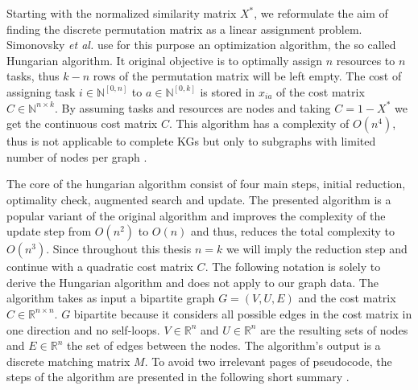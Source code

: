 {%
Starting with the normalized similarity matrix $X^*$, we reformulate the aim of finding the discrete permutation matrix as a linear assignment problem. Simonovsky \textit{et al.} \cite{silver_mastering_2017}use for this purpose an optimization algorithm, the so called Hungarian algorithm. It original objective is to optimally assign $n$ resources to $n$ tasks, thus $k-n$ rows of the permutation matrix will be left empty. The cost of assigning task $i \in \mathbb{N}^{[0,n]}$ to $a \in \mathbb{N}^{[0,k]}$ is stored in $x_{ia}$ of the cost matrix $C \in \mathbb{N}^{n \times k}$. By assuming tasks and resources are nodes and taking $C=1-X^*$ we get the continuous cost matrix $C$. This algorithm has a complexity of $O\left(n^{4}\right)$, thus is not applicable to complete KGs but only to subgraphs with limited number of nodes per graph \cite{date_gpu-accelerated_2016}.

The core of the hungarian algorithm consist of four main steps, initial reduction, optimality check, augmented search and update. The presented algorithm is a popular variant of the original algorithm and improves the complexity of the update step from $O\left(n^{2}\right)$ to $O\left(n\right)$ and thus, reduces the total complexity to $O\left(n^{3}\right)$. Since throughout this thesis $n=k$ we will imply the reduction step and continue with a quadratic cost matrix $C$. The following notation is solely to derive the Hungarian algorithm and does not apply to our graph data. The algorithm takes as input a bipartite graph $G=(V, U, E)$ and the cost matrix $C \in \mathbb{R}^{n \times n}$. $G$ bipartite because it considers all possible edges in the cost matrix in one direction and no self-loops. $V \in \mathbb{R}^n$ and $U \in \mathbb{R}^n$ are the resulting sets of nodes and $E \in \mathbb{R}^{n}$ the set of edges between the nodes. The algorithm's output is a discrete matching matrix $M$. To avoid two irrelevant pages of pseudocode, the steps of the algorithm are presented in the following short summary \cite{mills-tettey_dynamic_nodate}.

}
